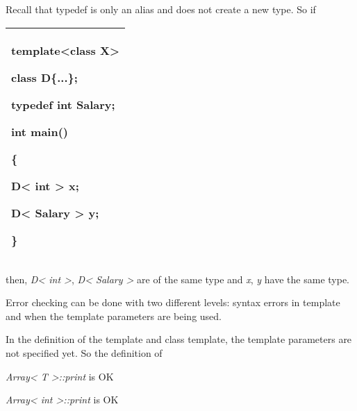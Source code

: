 \documentclass[
]{article}
\begin{document}
Recall that typedef is only an alias and does not create a new type. So
if

\begin{longtable}[]{@{}l@{}}
\toprule
\endhead
\begin{minipage}[t]{0.97\columnwidth}\raggedright
template\textless class X\textgreater{}

class D\{...\};

typedef int Salary;

int main()

\{

D\textless{} int \textgreater{} x;

D\textless{} Salary \textgreater{} y;

\}\strut
\end{minipage}\tabularnewline
\bottomrule
\end{longtable}

then, \emph{D\textless{} int \textgreater{}}, \emph{D\textless{} Salary
\textgreater{}} are of the same type and \emph{x}, \emph{y} have the
same type.

Error checking can be done with two different levels: syntax errors in
template and when the template parameters are being used.

In the definition of the template and class template, the template
parameters are not specified yet. So the definition of

\emph{Array\textless{} T \textgreater::print} is OK

\emph{Array\textless{} int \textgreater::print} is OK
\end{document}
